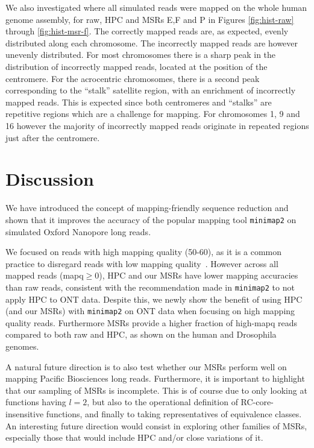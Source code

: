 \documentclass[
  11pt,
  twoside]{scrbook}
\begin{document}
We also investigated where all simulated reads were mapped on the whole human genome assembly, for raw, HPC and MSRs E,F and P in Figures \ref{fig:hist-raw} through \ref{fig:hist-msr-f}. The correctly mapped reads are, as expected, evenly distributed along each chromosome. The incorrectly mapped reads are however unevenly distributed. For most chromosomes there is a sharp peak in the distribution of incorrectly mapped reads, located at the position of the centromere. For the acrocentric chromosomes, there is a second peak corresponding to the ``stalk'' satellite region, with an enrichment of incorrectly mapped reads. This is expected since both centromeres and ``stalks'' are repetitive regions which are a challenge for mapping. For chromosomes 1, 9 and 16 however the majority of incorrectly mapped reads originate in repeated regions just after the centromere.

\hypertarget{discussion}{%
\section{Discussion}\label{discussion}}

We have introduced the concept of mapping-friendly sequence reduction and shown that it improves the accuracy of the popular mapping tool \texttt{minimap2} on simulated Oxford Nanopore long reads.

We focused on reads with high mapping quality (50-60), as it is a common practice to disregard reads with low mapping quality~\autocite{prodanovSensitiveAlignmentUsing2020,liNewStrategiesImprove2021,liSyntheticdiploidBenchmarkAccurate2018}. However across all mapped reads (mapq\(\geq 0\)), HPC and our MSRs have lower mapping accuracies than raw reads, consistent with the recommendation made in \texttt{minimap2} to not apply HPC to ONT data. Despite this, we newly show the benefit of using HPC (and our MSRs) with \texttt{minimap2} on ONT data when focusing on high mapping quality reads. Furthermore MSRs provide a higher fraction of high-mapq reads compared to both raw and HPC, as shown on the human and Drosophila genomes.

A natural future direction is to also test whether our MSRs perform well on mapping Pacific Biosciences long reads. Furthermore, it is important to highlight that our sampling of MSRs is incomplete. This is of course due to only looking at functions having \(l=2\), but also to the operational definition of RC-core-insensitive functions, and finally to taking representatives of equivalence classes. An interesting future direction would consist in exploring other families of MSRs, especially those that would include HPC and/or close variations of it.
\end{document}
